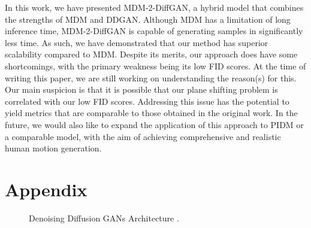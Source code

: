\documentclass[10pt,twocolumn,letterpaper]{article}
\begin{document}
In this work, we have presented MDM-2-DiffGAN, a hybrid model that combines the strengths of MDM and DDGAN. Although MDM has a 
limitation of long inference time, MDM-2-DiffGAN is capable of generating samples in significantly less time. As such, we have 
demonstrated that our method has superior scalability compared to MDM. Despite its merits, our approach does have some shortcomings,
with the primary weakness being its low FID scores. At the time of writing this paper, we are still working on understanding the 
reason(s) for this. Our main suspicion is that it is possible that our plane shifting problem is correlated with our low FID scores. 
Addressing this issue has the potential to yield metrics that are comparable to those obtained in the original work. In the future, 
we would also like to expand the application of this approach to PIDM or a comparable model, with the aim of achieving comprehensive 
and realistic human motion generation.

\newpage
{\small


}


\appendix
\section{Appendix}

\begin{figure}[H]
    \centering

    \caption{Denoising Diffusion GANs Architecture \cite{Xiao22}.}
    \label{fig:intro-1}
\end{figure}
\end{document}
